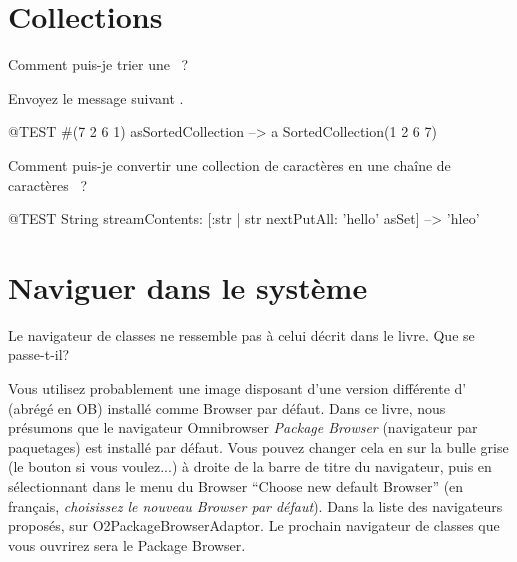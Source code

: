 \documentclass[a4paper,10pt,twoside]{book}
\begin{document}
\section{Collections}

\begin{faq}
Comment puis-je trier une ~?

\end{faq}
\answer
Envoyez le message suivant .

\begin{code}{@TEST}
#(7 2 6 1) asSortedCollection --> a SortedCollection(1 2 6 7)
\end{code}

\begin{faq}
Comment puis-je convertir une collection de caractères en une 
chaîne de caractères
~?
\end{faq}
\answer
\begin{code}{@TEST}
String streamContents: [:str | str nextPutAll: 'hello' asSet] --> 'hleo'
\end{code}

\section{Naviguer dans le système}

\begin{faq}
Le navigateur de classes ne ressemble pas à celui décrit dans le
livre. Que se passe-t-il?
\end{faq}
\answer
Vous utilisez probablement une image disposant d'une version
différente d'
(abrégé en OB) %
installé comme Browser par défaut.
Dans ce livre, nous présumons que le navigateur Omnibrowser
\emph{Package Browser} (navigateur par paquetages) est installé par
défaut.
Vous pouvez changer cela en \clickant sur la bulle grise (le bouton si vous voulez...)
à droite de la barre de titre du navigateur, puis en sélectionnant
dans le menu du Browser ``Choose new default Browser'' (en français,
\emph{choisissez le nouveau Browser par défaut}). Dans la liste des
navigateurs proposés, \clickz sur O2PackageBrowserAdaptor. 
Le prochain navigateur de classes que vous ouvrirez sera le Package Browser. %
\end{document}
